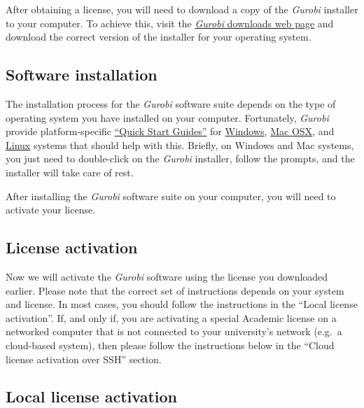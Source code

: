 \documentclass[
  12pt,
]{book}
\begin{document}
After obtaining a license, you will need to download a copy of the \emph{Gurobi} installer to your computer. To achieve this, visit the \href{https://www.gurobi.com/downloads/gurobi-optimizer}{\emph{Gurobi} downloads web page} and download the correct version of the installer for your operating system.

\hypertarget{software-installation}{%
\subsection{Software installation}\label{software-installation}}

The installation process for the \emph{Gurobi} software suite depends on the type of operating system you have installed on your computer. Fortunately, \emph{Gurobi} provide platform-specific \href{https://www.gurobi.com/documentation/}{``Quick Start Guides''} for \href{https://www.gurobi.com/documentation/8.1/quickstart_windows/software_installation_guid.html\#section:Installation}{Windows}, \href{https://www.gurobi.com/documentation/8.1/quickstart_mac/software_installation_guid.html}{Mac OSX}, and \href{https://www.gurobi.com/documentation/8.1/quickstart_linux/software_installation_guid.html}{Linux} systems that should help with this. Briefly, on Windows and Mac systems, you just need to double-click on the \emph{Gurobi} installer, follow the prompts, and the installer will take care of rest.

After installing the \emph{Gurobi} software suite on your computer, you will need to activate your license.

\hypertarget{license-activation}{%
\subsection{License activation}\label{license-activation}}

Now we will activate the \emph{Gurobi} software using the license you downloaded earlier. Please note that the correct set of instructions depends on your system and license. In most cases, you should follow the instructions in the ``Local license activation''. If, and only if, you are activating a special Academic license on a networked computer that is not connected to your university's network (e.g.~a cloud-based system), then please follow the instructions below in the ``Cloud license activation over SSH'' section.

\hypertarget{local-license-activation}{%
\subsection{Local license activation}\label{local-license-activation}}
\end{document}
